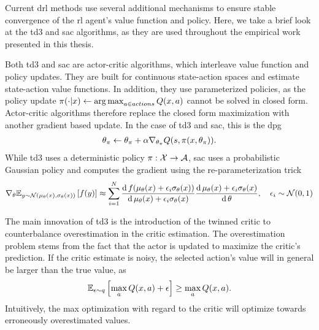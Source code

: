 Current \ac{drl} methods use several additional mechanisms to ensure stable convergence of the \ac{rl} agent's value function and policy.
Here, we take a brief look at the \ac{td3} and \ac{sac} algorithms, as they are used throughout the empirical work presented in this thesis.

Both \ac{td3} and \ac{sac} are actor-critic algorithms, which interleave value function and policy updates.
They are built for continuous state-action spaces and estimate state-action value functions.
In addition, they use parameterized policies, as the policy update $\pi(\cdot|x) \leftarrow \operatorname*{arg\,max}_{a \in actions} Q(x,a)$ cannot be solved in closed form.
Actor-critic algorithms therefore replace the closed form maximization with another gradient based update.
In the case of \ac{td3} and \ac{sac}, this is the \ac{dpg} \parencite{silver2014deterministic}
\begin{align}
    \theta_\pi \leftarrow \theta_\pi + \alpha \nabla_{\theta_\pi} Q(s, \pi(x, \theta_\pi)).
\end{align}
While \ac{td3} uses a deterministic policy $\pi: \mathcal{X} \rightarrow \mathcal{A}$, \ac{sac} uses a probabilistic Gaussian policy and computes the gradient using the re-parameterization trick
\begin{align}
    \nabla_{\theta} \mathbb{E}_{y \sim \mathcal{N}(\mu_\theta(x), \sigma_\theta(x))}\left[  f(y) \right] \approx \sum_{i=1}^{N} \frac{\mathrm{d}\,f(\mu_\theta(x) + \epsilon_i \sigma_\theta(x))}{\mathrm{d}\, \mu_\theta(x) + \epsilon_i \sigma_\theta(x)}  \frac{\mathrm{d}\,\mu_\theta(x) + \epsilon_i \sigma_\theta(x)}{\mathrm{d}\,\theta}, \quad \epsilon_i \sim \mathcal{N}(0,1)
\end{align}

The main innovation of \ac{td3} is the introduction of the twinned critic to counterbalance overestimation in the critic estimation.
The overestimation problem stems from the fact that the actor is updated to maximize the critic's prediction.
If the critic estimate is noisy, the selected action's value will in general be larger than the true value, as
\begin{align}
    \mathbb{E}_{\epsilon\sim q}\left[  \max_a Q(x,a) + \epsilon \right] \geq \max_a Q(x,a).
\end{align}
Intuitively, the max optimization with regard to the critic will optimize towards erroneously overestimated values.

